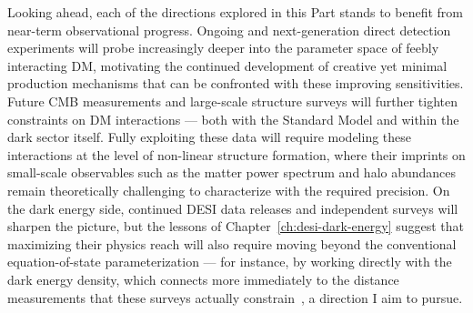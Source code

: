 Looking ahead, each of the directions explored in this Part stands to benefit from near-term observational progress. Ongoing and next-generation direct detection experiments will probe increasingly deeper into the parameter space of feebly interacting DM, motivating the continued development of creative yet minimal production mechanisms that can be confronted with these improving sensitivities. Future CMB measurements and large-scale structure surveys will further tighten constraints on DM interactions --- both with the Standard Model and within the dark sector itself. Fully exploiting these data will require modeling these interactions at the level of non-linear structure formation, where their imprints on small-scale observables such as the matter power spectrum and halo abundances remain theoretically challenging to characterize with the required precision. On the dark energy side, continued DESI data releases and independent surveys will sharpen the picture, but the lessons of Chapter~\ref{ch:desi-dark-energy} suggest that maximizing their physics reach will also require moving beyond the conventional equation-of-state parameterization --- for instance, by working directly with the dark energy density, which connects more immediately to the distance measurements that these surveys actually constrain~\cite{Wang:2025vfb}, a direction I aim to pursue.

